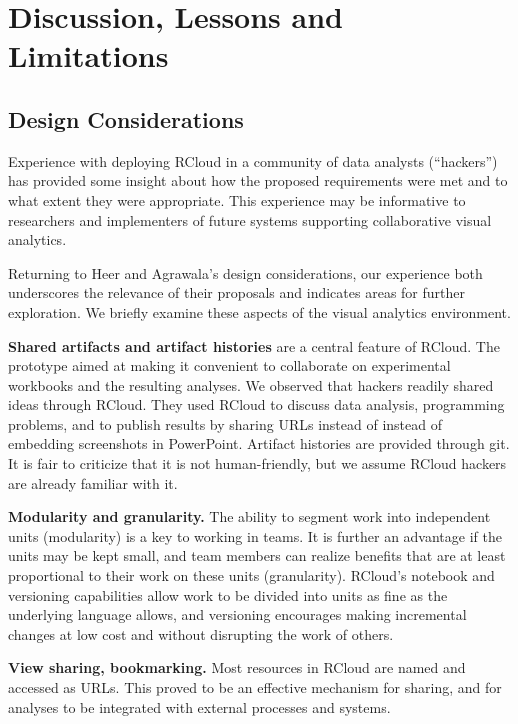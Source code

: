 \section{Discussion, Lessons and Limitations}
\label{sec:limitations}

\subsection{Design Considerations}


Experience with deploying RCloud in a community of data analysts
(``hackers'') has provided some insight about how the proposed
requirements were met and to what extent they were appropriate.
This experience may be informative to researchers and implementers
of future systems supporting collaborative visual analytics.

Returning to Heer and Agrawala's design considerations, our experience
both underscores the relevance of their proposals and indicates areas
for further exploration. We briefly examine these aspects of the
visual analytics environment.

{\bf Shared artifacts and artifact histories} are a central feature
of RCloud. The prototype aimed at making it convenient to collaborate
on experimental workbooks and the resulting analyses. We observed
that hackers readily shared ideas through RCloud. They used RCloud
to discuss data analysis, programming problems, and to publish results
by sharing URLs instead of instead of embedding screenshots in
PowerPoint. Artifact histories are provided through git. It is fair
to criticize that it is not human-friendly, but we assume RCloud
hackers are already familiar with it.

{\bf Modularity and granularity.} The ability to segment work into
independent units (modularity) is a key to working in teams. It is
further an advantage if the units may be kept small, and team members
can realize benefits that are at least proportional to their work
on these units (granularity). RCloud's notebook and versioning
capabilities allow work to be divided into units as fine as
the underlying language allows, and versioning encourages making
incremental changes at low cost and without disrupting the work
of others.

{\bf View sharing, bookmarking.} Most resources in RCloud are named
and accessed as URLs. This proved to be an effective mechanism for
sharing, and for analyses to be integrated with external processes
and systems.

